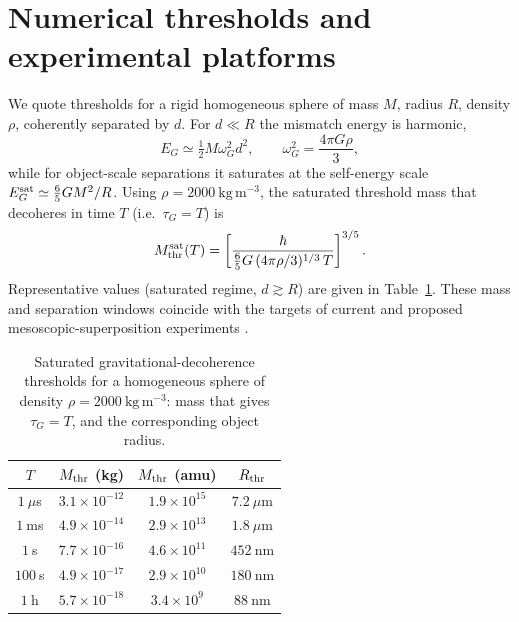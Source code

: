 \documentclass[aps,pra,preprint,amsmath,amssymb,nofootinbib,superscriptaddress]{revtex4-2}
\begin{document}
\section{Numerical thresholds and experimental platforms}
\label{sec:thresholds}

We quote thresholds for a rigid homogeneous sphere of mass $M$, radius $R$,
density $\rho$, coherently separated by $d$. For $d\ll R$ the mismatch energy is
harmonic,
\begin{equation}
E_G\simeq\tfrac12 M\omega_G^2 d^2,\qquad \omega_G^2=\frac{4\pi G\rho}{3},
\end{equation}
while for object-scale separations it saturates at the self-energy scale
$E_G^{\rm sat}\simeq\tfrac{6}{5}GM^2/R$. Using
$\rho=2000~\mathrm{kg\,m^{-3}}$, the saturated threshold mass that decoheres in
time $T$ (i.e.\ $\tau_G=T$) is
\begin{equation}
M_{\rm thr}^{\rm sat}(T)=
\left[\frac{\hbar}{\tfrac{6}{5}G\,(4\pi\rho/3)^{1/3}\,T}\right]^{3/5}.
\end{equation}
Representative values (saturated regime, $d\gtrsim R$) are given in
Table~\ref{tab:thresholds}. These mass and separation windows coincide with the
targets of current and proposed mesoscopic-superposition experiments
\cite{arndt2014,bose2017,marshall2003,nimmrichter2013}.

\begin{table}[t]
\caption{\label{tab:thresholds}
Saturated gravitational-decoherence thresholds for a homogeneous sphere of
density $\rho=2000~\mathrm{kg\,m^{-3}}$: mass that gives $\tau_G=T$, and the
corresponding object radius.}
\begin{ruledtabular}
\begin{tabular}{cccc}
$T$ & $M_{\rm thr}$ (kg) & $M_{\rm thr}$ (amu) & $R_{\rm thr}$ \\
\hline
$1~\mu$s & $3.1\times10^{-12}$ & $1.9\times10^{15}$ & $7.2~\mu$m \\
$1~$ms   & $4.9\times10^{-14}$ & $2.9\times10^{13}$ & $1.8~\mu$m \\
$1~$s    & $7.7\times10^{-16}$ & $4.6\times10^{11}$ & $452~$nm \\
$100~$s  & $4.9\times10^{-17}$ & $2.9\times10^{10}$ & $180~$nm \\
$1~$h    & $5.7\times10^{-18}$ & $3.4\times10^{9}$  & $88~$nm \\
\end{tabular}
\end{ruledtabular}
\end{table}
\end{document}
